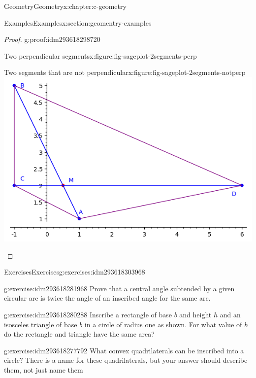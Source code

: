\documentclass[twoside,10pt,]{book}
\numberwithin{equation}{section}
\begin{document}
\begin{chapterptx}{Geometry}{}{Geometry}{}{}{x:chapter:c-geometry}
\begin{sectionptx}{Examples}{}{Examples}{}{}{x:section:geomentry-examples}
\begin{proof}{}{g:proof:idm293618298720}
\begin{sidebyside}{2}{0}{0}{0}
\begin{sbspanel}{0.5}
\begin{figureptx}{Two perpendicular segments}{x:figure:fig-sageplot-2segments-perp}{}
\tcblower
\end{figureptx}%
\end{sbspanel}%
\begin{sbspanel}{0.5}%
\begin{figureptx}{Two segments that are not perpendicular}{x:figure:fig-sageplot-2segments-notperp}{}%
\includegraphics[width=\linewidth]{images/sageplot-2segments-notperp.png}
\tcblower
\end{figureptx}%
\end{sbspanel}%
\end{sidebyside}%
\end{proof}
\end{sectionptx}
%
%
\typeout{************************************************}
\typeout{************************************************}
%
\begin{exercises-section}{Exercises}{}{Exercises}{}{}{g:exercises:idm293618303968}
\begin{divisionexercise}{1}{}{}{g:exercise:idm293618281968}%
Prove that a central angle subtended by a given circular arc is twice the angle of an inscribed angle for the same arc.%
\end{divisionexercise}%
\begin{divisionexercise}{2}{}{}{g:exercise:idm293618280288}%
Inscribe a rectangle of base \(b\) and height \(h\) and an isosceles triangle of base \(b\) in a circle of radius one as shown. For what value of \(h\) do the rectangle and triangle have the same area?%
\end{divisionexercise}%
\begin{divisionexercise}{3}{}{}{g:exercise:idm293618277792}%
What convex quadrilaterals can be inscribed into a circle? There is a name for these quadrilaterals, but your answer should describe them, not just name them%

\end{divisionexercise}
\end{exercises-section}
\end{chapterptx}
\end{document}
